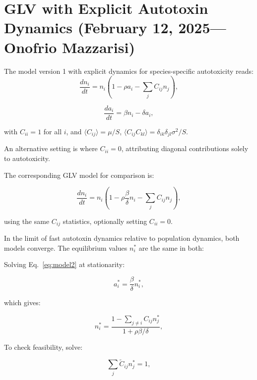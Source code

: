 \documentclass[11pt,a4paper,fleqn]{scrartcl}
\begin{document}
\section{GLV with Explicit Autotoxin Dynamics (February 12, 2025---  Onofrio Mazzarisi)}

The model version 1 with explicit dynamics for species-specific autotoxicity reads:
\begin{equation}
\frac{dn_i}{dt} = n_i \left(1 - \rho a_i - \sum_j C_{ij} n_j \right), \label{eq:model1again}
\end{equation}

\begin{equation}
\frac{da_i}{dt} = \beta n_i - \delta a_i, \label{eq:model2again}
\end{equation}

with $C_{ii} = 1$ for all $i$, and $\langle C_{ij} \rangle = \mu/S$, $\langle C_{ij} C_{kl} \rangle = \delta_{ik} \delta_{jl} \sigma^2 / S$.

An alternative setting is where $C_{ii} = 0$, attributing diagonal contributions solely to autotoxicity.

The corresponding GLV model for comparison is:

\begin{equation}
\frac{dn_i}{dt} = n_i \left(1 - \rho \frac{\beta}{\delta} n_i - \sum_j C_{ij} n_j \right), \label{eq:glv}
\end{equation}

using the same $C_{ij}$ statistics, optionally setting $C_{ii} = 0$.

In the limit of fast autotoxin dynamics relative to population dynamics, both models converge. The equilibrium values $n_i^*$ are the same in both:

Solving Eq.~\eqref{eq:model2} at stationarity:

\begin{equation}
a_i^* = \frac{\beta}{\delta} n_i^*, \label{eq:equilibrium_ai}
\end{equation}

which gives:

\begin{equation}
n_i^* = \frac{1 - \sum_{j \ne i} C_{ij} n_j^*}{1 + \rho \beta / \delta}, \label{eq:equilibrium_ni}
\end{equation}

To check feasibility, solve:

\begin{equation}
\sum_j \tilde{C}_{ij} n_j^* = 1, \label{eq:feasibility}
\end{equation}
\end{document}
